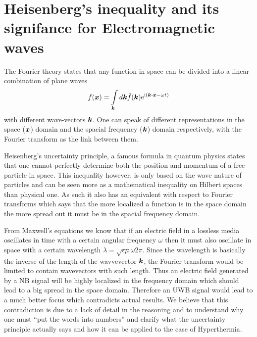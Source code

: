 \documentclass[11pt,a4paper, 
english, swedish %
]{article}
\begin{document}


%








\section{Heisenberg's inequality and its signifance for Electromagnetic waves}
The Fourier theory states that any function in space can be divided into a linear combination of plane waves 
\begin{equation*}
 f(\vb*x) = \int_{\vb*k}d\vb*k \tilde{f}(\vb*k) \ee^{\ii( \vb*k\vdot\vb*x - \omega t)}
\end{equation*}
with different wave-vectors $\vb*k$. %
One can speak of different representations in the space ($\vb*x$) domain and the spacial frequency ($\vb*k$) domain respectively, with the Fourier transform as the link between them.

Heisenberg's uncertainty principle, a famous formula in quantum physics states that one cannot perfectly determine both the position and momentum of a free particle in space. This inequality however, is only based on the wave nature of particles and can be seen more as a mathematical inequality on Hilbert spaces than  physical one. As such it also has an equivalent with respect to Fourier transforms which says that the more localized a function is in the space domain the more spread out it must be in the spacial frequency domain.

From Maxwell's equations we know that if an electric field in a lossless media oscillates in time with a certain angular frequency $\omega$ then it  must also oscillate in space with a certain wavelength $\lambda=\sqrt{\epsilon \mu} \omega 2\pi$. Since the wavelength is basically the inverse of the length of the wavvevector $\vb*k$, the Fourier transform would be limited to contain wavevectors with such length. Thus an electric field generated by a NB signal will be highly localized in the frequency domain which should lead to a big spread in the space domain. Therefore an UWB signal would lead to a much better focus which contradicts actual results. We believe that this contradiction is due to a lack of detail in the reasoning and to understand why one must ``put the words into numbers'' and clarify what the uncertainty principle actually says and how it can be applied to the case of Hyperthermia.
\end{document}
